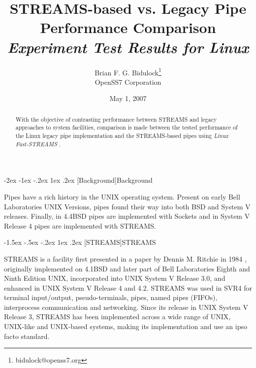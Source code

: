 \documentclass[letterpaper,final,notitlepage,twocolumn,10pt,twoside]{article}
\makeatletter
\renewcommand\section{\@startsection {section}{1}{\z@}%
                                   {-2ex \@plus -1ex \@minus -.2ex}%
                                   {1ex \@plus .2ex}%
                                   {\normalfont\large\bfseries}}
\renewcommand\subsection{\@startsection{subsection}{2}{\z@}%
                                     {-1.5ex \@plus -.5ex \@minus -.2ex}%
                                     {1ex \@plus .2ex}%
                                     {\normalfont\normalsize\bfseries}}
\makeatother
\begin{document}

\title{STREAMS-based vs. Legacy Pipe Performance Comparison\\[0.5ex]
	{\large \textsl{Experiment Test Results for Linux}}}
\author{Brian F. G. Bidulock\thanks{bidulock@openss7.org}\\
	OpenSS7 Corporation}
\date{May 1, 2007}
\maketitle

\begin{abstract}
With the objective of contrasting performance between STREAMS and legacy
approaches to system facilities, comparison is made between the tested
performance of the Linux legacy pipe implementation and the STREAMS-based
pipes using \textsl{Linux Fast-STREAMS} \cite[]{LfS}.
\end{abstract}


\section[Background]{Background}

Pipes have a rich history in the UNIX operating system.  Present on early Bell
Laboratories UNIX Versions, pipes found their way into both BSD and System V
releases.  Finally, in 4.4BSD pipes are implemented with Sockets and in System
V Release 4 pipes are implemented with STREAMS.

\subsection[STREAMS]{STREAMS}

STREAMS is a facility first presented in a paper by Dennis M. Ritchie in 1984
\cite[]{Ritchie84}, originally implemented on 4.1BSD and later part of Bell
Laboratories Eighth and Ninth Edition UNIX, incorporated into UNIX System V
Release 3.0, and enhanced in UNIX System V Release 4 and 4.2.  STREAMS was
used in SVR4 for terminal input/output, pseudo-terminals, pipes, named pipes
(FIFOs), interprocess communication and networking.  Since its release in UNIX
System V Release 3, STREAMS has been implemented across a wide range of UNIX,
UNIX-like and UNIX-based systems, making its implementation and use an ipso
facto standard.
\end{document}
